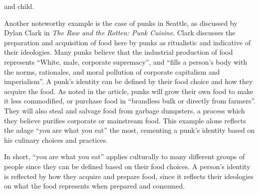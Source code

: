\documentclass{article}
\begin{document}
and child. \par
Another noteworthy example is the case of punks in Seattle, as discussed by
Dylan Clark in \textit{The Raw and the Rotten: Punk Cuisine}. Clark discusses
the preparation and acquisition of food here by punks as ritualistic and
indicative of their ideologies. Many punks believe that the industrial
production of food represents ``White, male, corporate supremacy'', and ``fills
a person's body with the norms, rationales, and moral pollution of corporate
capitalism and imperialism''. A punk's identity can be defined by their food
choice and how they acquire the food. As noted in the article, punks will grow
their own food to make it less commodified, or purchase food in ``brandless
bulk or directly from farmers''. They will also steal and salvage food from
garbage dumpsters, a process which they believe purifies corporate or
mainstream food. This example alone reflects the adage ``you are what you eat''
the most, cementing a punk's identity based on his culinary choices and
practices. \par
In short, ``you are what you eat'' applies culturally to many different groups
of people since they can be defined based on their food choices. A person's
identity is reflected by how they acquire and prepare food, since it reflects
their ideologies on what the food represents when prepared and consumed.
\end{document}
